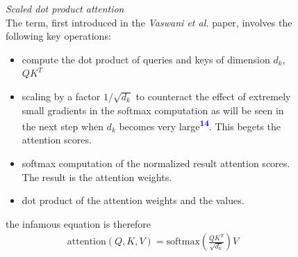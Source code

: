 \documentclass[12pt]{article}
\newcommand{\customtext}[3]{%
    \vspace{#2} %
    \fontsize{13}{8}\textcolor{#1}{\textit{#3}}%
}
\newcommand{\sidecite}[1]{\textsuperscript{\textcolor{blue}{\textbf{\scriptsize#1}}}}
\begin{document}
\pagebreak
\begin{figure}[!htb]
    \begin{minipage}[t]{0.65\textwidth}
    \raggedright
    \customtext{xtitle}{-1em}{Scaled dot product attention}\\
    The term, first introduced in the {\it Vaswani et al.} paper, involves the following key operations:
    \begin{itemize}[left=0pt,topsep=0pt,itemsep=-1ex,parsep=0ex]
        \item compute the dot product of queries and keys of dimension $d_k$, $QK^T$
        \item scaling by a factor $1/\sqrt{d_k}$ to counteract the effect of extremely small gradients in the 
        softmax computation as will be seen in the next step when $d_k$ becomes very large\sidecite{14}.
        This begets the attention scores.
        \item softmax computation of the normalized result attention scores. The result is the attention weights.
        \item dot product of the attention weights and the values.
      \end{itemize}
      \vspace{1em}
      the infamous equation is therefore\\
      \vspace{-2em}
      \begin{gather*}
          \text{attention}(Q,K,V)=\text{softmax}\left(\frac{QK^T}{\sqrt{d_k}}\right)V
      \end{gather*}
      \begin{figure}[H]
        \centering
\end{figure}
\end{minipage}
\end{figure}
\end{document}
